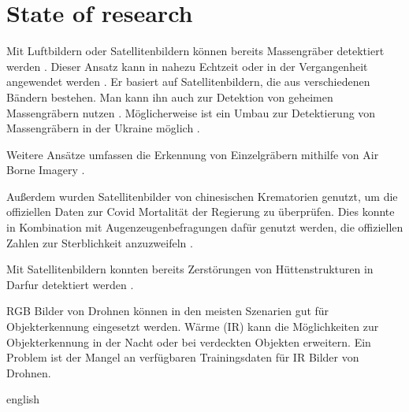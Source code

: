 \chapter{State of research}
\label{ch:state_of_research}
  \ifimportant
Mit Luftbildern oder Satellitenbildern können bereits Massengräber detektiert werden \cite{Kalacska2006}. 
Dieser Ansatz kann in nahezu Echtzeit oder in der Vergangenheit angewendet werden \cite{Kalacska2006}. 
Er basiert auf Satellitenbildern, die aus verschiedenen Bändern bestehen. 
Man kann ihn auch zur Detektion von geheimen Massengräbern nutzen \cite{Kalacska2006}. 
Möglicherweise ist ein Umbau zur Detektierung von Massengräbern in der Ukraine möglich \cite{Kalacska2006}.

Weitere Ansätze umfassen die Erkennung von Einzelgräbern mithilfe von Air Borne Imagery \cite{Leblanc2014}.

Außerdem wurden Satellitenbilder von chinesischen Krematorien genutzt, um die offiziellen Daten zur Covid Mortalität der Regierung zu überprüfen. 
Dies konnte in Kombination mit Augenzeugenbefragungen dafür genutzt werden, die offiziellen Zahlen zur Sterblichkeit anzuzweifeln \cite{Spiegel_article}.

Mit Satellitenbildern konnten bereits Zerstörungen von Hüttenstrukturen in Darfur detektiert werden \cite{Knoth2017}. 




RGB Bilder von Drohnen können in den meisten Szenarien gut für Objekterkennung eingesetzt werden. 
Wärme (IR) kann die Möglichkeiten zur Objekterkennung in der Nacht oder bei verdeckten Objekten erweitern. 
Ein Problem ist der Mangel an verfügbaren Trainingsdaten für IR Bilder von Drohnen. 

\else
english
\fi

